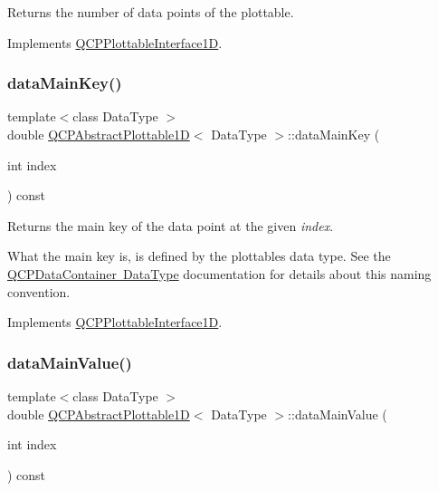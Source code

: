 Returns the number of data points of the plottable. 

Implements \mbox{\hyperlink{class_q_c_p_plottable_interface1_d_a058a22c770ef4d5a0e878a7f02183da9}{Q\+C\+P\+Plottable\+Interface1D}}.

\mbox{\label{class_q_c_p_abstract_plottable1_d_aeb156ebf5d3c8de906b428be30733ad8}} 
\subsubsection{\texorpdfstring{dataMainKey()}{dataMainKey()}}
{\footnotesize\ttfamily template$<$class Data\+Type $>$ \\
double \mbox{\hyperlink{class_q_c_p_abstract_plottable1_d}{Q\+C\+P\+Abstract\+Plottable1D}}$<$ Data\+Type $>$\+::data\+Main\+Key (\begin{DoxyParamCaption}\item[{int}]{index }\end{DoxyParamCaption}) const\hspace{0.3cm}{\ttfamily [virtual]}}





Returns the main key of the data point at the given {\itshape index}.

What the main key is, is defined by the plottable\textquotesingle{}s data type. See the \mbox{\hyperlink{class_q_c_p_data_container_qcpdatacontainer-datatype}{Q\+C\+P\+Data\+Container Data\+Type}} documentation for details about this naming convention. 

Implements \mbox{\hyperlink{class_q_c_p_plottable_interface1_d_a2bd60daaac046945fead558cbd83cf73}{Q\+C\+P\+Plottable\+Interface1D}}.

\mbox{\label{class_q_c_p_abstract_plottable1_d_a6be0f657ba85a1688336d76ad649ecf2}} 
\subsubsection{\texorpdfstring{dataMainValue()}{dataMainValue()}}
{\footnotesize\ttfamily template$<$class Data\+Type $>$ \\
double \mbox{\hyperlink{class_q_c_p_abstract_plottable1_d}{Q\+C\+P\+Abstract\+Plottable1D}}$<$ Data\+Type $>$\+::data\+Main\+Value (\begin{DoxyParamCaption}\item[{int}]{index }\end{DoxyParamCaption}) const\hspace{0.3cm}{\ttfamily [virtual]}}





